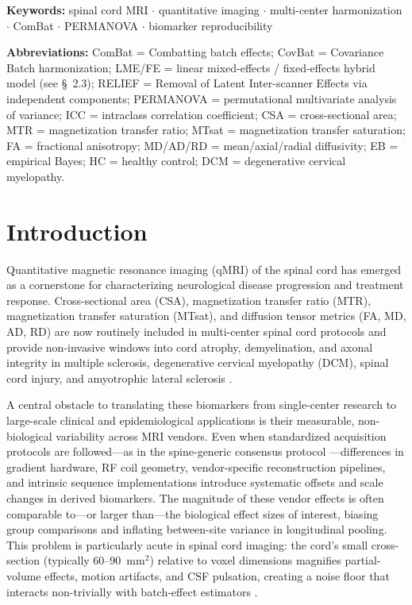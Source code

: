 \documentclass[12pt,a4paper]{article}
\begin{document}
\vspace{4mm}
\noindent\textbf{Keywords:} spinal cord MRI $\cdot$ quantitative imaging $\cdot$ multi-center harmonization $\cdot$ ComBat $\cdot$ PERMANOVA $\cdot$ biomarker reproducibility

\noindent\textbf{Abbreviations:} ComBat = Combatting batch effects; CovBat = Covariance Batch harmonization; LME/FE = linear mixed-effects / fixed-effects hybrid model (see \S~2.3); RELIEF = Removal of Latent Inter-scanner Effects via independent components; PERMANOVA = permutational multivariate analysis of variance; ICC = intraclass correlation coefficient; CSA = cross-sectional area; MTR = magnetization transfer ratio; MTsat = magnetization transfer saturation; FA = fractional anisotropy; MD/AD/RD = mean/axial/radial diffusivity; EB = empirical Bayes; HC = healthy control; DCM = degenerative cervical myelopathy.

\newpage

\section{Introduction}

Quantitative magnetic resonance imaging (qMRI) of the spinal cord has emerged as a cornerstone for characterizing neurological disease progression and treatment response. Cross-sectional area (CSA), magnetization transfer ratio (MTR), magnetization transfer saturation (MTsat), and diffusion tensor metrics (FA, MD, AD, RD) are now routinely included in multi-center spinal cord protocols \cite{cohen2021opena} and provide non-invasive windows into cord atrophy, demyelination, and axonal integrity in multiple sclerosis, degenerative cervical myelopathy (DCM), spinal cord injury, and amyotrophic lateral sclerosis \cite{freund2024dcm}.

A central obstacle to translating these biomarkers from single-center research to large-scale clinical and epidemiological applications is their measurable, non-biological variability across MRI vendors. Even when standardized acquisition protocols are followed---as in the spine-generic consensus protocol \cite{cohen2021opena,cohen2021generic}---differences in gradient hardware, RF coil geometry, vendor-specific reconstruction pipelines, and intrinsic sequence implementations introduce systematic offsets and scale changes in derived biomarkers. The magnitude of these vendor effects is often comparable to---or larger than---the biological effect sizes of interest, biasing group comparisons and inflating between-site variance in longitudinal pooling. This problem is particularly acute in spinal cord imaging: the cord's small cross-section (typically 60--90~mm$^2$) relative to voxel dimensions magnifies partial-volume effects, motion artifacts, and CSF pulsation, creating a noise floor that interacts non-trivially with batch-effect estimators \cite{prados2017spinal}.
\end{document}
